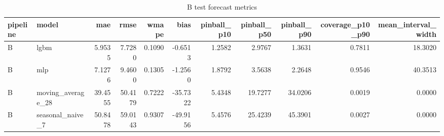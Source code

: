 \begin{table}
\caption{B test forecast metrics}
\label{tab:metrics-B}
\begin{tabular}{llrrrrrrrrr}
\toprule
pipeline & model & mae & rmse & wmape & bias & pinball\_p10 & pinball\_p50 & pinball\_p90 & coverage\_p10\_p90 & mean\_interval\_width \\
\midrule
B & lgbm & 5.9535 & 7.7280 & 0.1090 & -0.6513 & 1.2582 & 2.9767 & 1.3631 & 0.7811 & 18.3020 \\
B & mlp & 7.1276 & 9.4600 & 0.1305 & -1.2560 & 1.8792 & 3.5638 & 2.2648 & 0.9546 & 40.3513 \\
B & moving\_average\_28 & 39.4555 & 50.4179 & 0.7222 & -35.7322 & 5.4348 & 19.7277 & 34.0206 & 0.0019 & 0.0000 \\
B & seasonal\_naive\_7 & 50.8478 & 59.0143 & 0.9307 & -49.9156 & 5.4576 & 25.4239 & 45.3901 & 0.0027 & 0.0000 \\
\bottomrule
\end{tabular}
\end{table}
